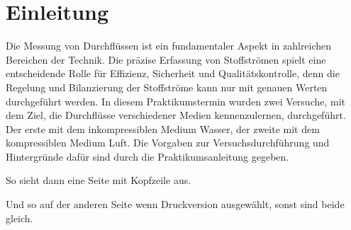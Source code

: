 \chapter{Einleitung}

Die Messung von Durchflüssen ist ein fundamentaler Aspekt in zahlreichen Bereichen der Technik. Die präzise Erfassung von Stoffströmen spielt eine entscheidende Rolle für Effizienz, Sicherheit und Qualitätskontrolle, denn die Regelung und Bilanzierung der Stoffströme kann nur mit genauen Werten durchgeführt werden. In diesem Praktikumstermin wurden zwei Versuche, mit dem Ziel, die Durchflüsse verschiedener Medien kennenzulernen, durchgeführt. Der erste mit dem inkompressiblen Medium Wasser, der zweite mit dem kompressiblen Medium Luft. Die Vorgaben zur Versuchsdurchführung und Hintergründe dafür sind durch die Praktikumsanleitung gegeben. \cite{waermeatlas} \cite{CanJour}

\newpage

So sieht dann eine Seite mit Kopfzeile aus.

\newpage

Und so auf der anderen Seite wenn Druckversion ausgewählt, sonst sind beide gleich.